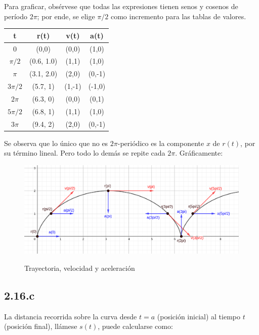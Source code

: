 \documentclass{article}
\begin{document}
Para graficar, obsérvese que todas las expresiones tienen senos y cosenos de período $2\pi$; por ende, se elige $\pi/2$ como incremento para las tablas de valores.

\begin{center}
\begin{tabular}{||c c c c||} 
 \hline
 t & r(t) & v(t) & a(t) \\ [0.5ex] 
 \hline\hline
 0 & (0,0) & (0,0) & (1,0) \\ 
 \hline
 $\pi/2$ & (0.6, 1.0) & (1,1) & (1,0) \\
 \hline
 $\pi$ & (3.1, 2.0) & (2,0) & (0,-1) \\
 \hline
 $3 \pi/2$ & (5.7, 1) & (1,-1) & (-1,0) \\
 \hline
 $2 \pi$ & (6.3, 0) & (0,0) & (0,1) \\
 \hline
 $5 \pi/2$ & (6.8, 1) & (1,1) & (1,0) \\
 \hline
 $3 \pi$ & (9.4, 2) & (2,0) & (0,-1) \\ [1ex] 
 \hline
\end{tabular}
\end{center}

Se observa que lo único que no es $2\pi$-periódico es la componente $x$ de $r(t)$, por su término lineal. Pero todo lo demás se repite cada $2\pi$. Gráficamente:

\begin{figure}[ht]
\caption{Trayectoria, velocidad y aceleración}
\includegraphics[scale=1]{img/ejercicios/2/16-b.png} 
\centering
\label{fig:2-16-b}
\end{figure}

\subsection*{2.16.c}
\label{subsec:2.16.c}

La distancia recorrida sobre la curva desde $t=a$ (posición inicial) al tiempo $t$ (posición final), llámese $s(t)$, puede calcularse como:
\end{document}
